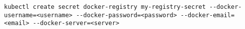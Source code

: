 \begin{verbatim}
kubectl create secret docker-registry my-registry-secret --docker-username=<username> --docker-password=<password> --docker-email=<email> --docker-server=<server>
\end{verbatim}